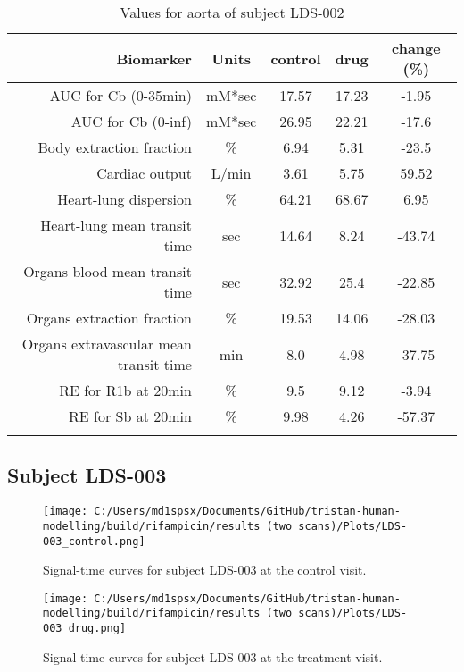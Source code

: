 \documentclass{epflreport}%
\begin{document}
\begin{longtable}{rcccc}%
\hline%
Biomarker&Units&control&drug&change (\%)\\%
\hline%
AUC for Cb (0{-}35min)&mM*sec&17.57&17.23&{-}1.95\\%
AUC for Cb (0{-}inf)&mM*sec&26.95&22.21&{-}17.6\\%
Body extraction fraction&\%&6.94&5.31&{-}23.5\\%
Cardiac output&L/min&3.61&5.75&59.52\\%
Heart{-}lung dispersion&\%&64.21&68.67&6.95\\%
Heart{-}lung mean transit time&sec&14.64&8.24&{-}43.74\\%
Organs blood mean transit time&sec&32.92&25.4&{-}22.85\\%
Organs extraction fraction&\%&19.53&14.06&{-}28.03\\%
Organs extravascular mean transit time&min&8.0&4.98&{-}37.75\\%
RE for R1b at 20min&\%&9.5&9.12&{-}3.94\\%
RE for Sb at 20min&\%&9.98&4.26&{-}57.37\\%
\hline%
\caption{Values for aorta of subject LDS-002} \\%
\end{longtable}%
\clearpage%
\subsection{Subject LDS{-}003}%
\label{subsec:SubjectLDS{-}003}%

%


\begin{figure}[h!]%
\centering%
\texttt{[image: C:/Users/md1spsx/Documents/GitHub/tristan-human-modelling/build/rifampicin/results (two scans)/Plots/LDS-003\_control.png]}%
\caption{Signal{-}time curves for subject LDS{-}003 at the control visit.}%
\end{figure}

%


\begin{figure}[h!]%
\centering%
\texttt{[image: C:/Users/md1spsx/Documents/GitHub/tristan-human-modelling/build/rifampicin/results (two scans)/Plots/LDS-003\_drug.png]}%
\caption{Signal{-}time curves for subject LDS{-}003 at the treatment visit.}%
\end{figure}
\end{document}
